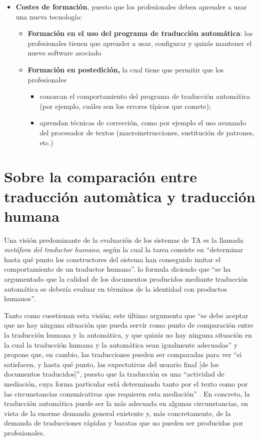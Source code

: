 \begin{itemize}
\item \textbf{Costes de formación}, puesto que los profesionales deben aprender a usar una nueva tecnología: \begin{itemize} \item \textbf{Formación en el uso del programa de traducción automática}: los profesionales tienen que aprender a usar, configurar y quizás mantener el nuevo software asociado \item \textbf{Formación en postedición,} la cual tiene que permitir que los profesionales \begin{itemize} \item conozcan el comportamiento del programa de traducción automática (por ejemplo, cuáles son los errores típicos que comete); \item aprendan técnicas de corrección, como por ejemplo el uso avanzado del procesador de textos (macroinstrucciones, sustitución de patrones, etc.) \end{itemize} \end{itemize} \end{itemize} 

\section[Traducción automática y traducción humana]{Sobre la comparación entre traducción automàtica y traducción humana} \label{ss:humaut} Una visión predominante de la evaluación de los sistemas de TA es la llamada \emph{metáfora del traductor humano}, según la cual \citep{krauwer93j} la tarea consiste en ``determinar hasta qué punto los constructores del sistema han conseguido imitar el comportamiento de un traductor humano''. \citet[p.~262]{sager93b} lo formula diciendo que ``se ha argumentado que la calidad de los documentos producidos mediante traducción automática se debería evaluar en términos de la identidad con productos humanos''. 

Tanto \citet{krauwer93j} como \citet{sager93b} cuestionan esta visión; este último argumenta que ``se debe aceptar que no hay ninguna situación que pueda servir como punto de comparación entre la traducción humana y la automática, y que quizás no hay ninguna situación en la cual la traducción humana y la automática sean igualmente adecuadas'' \citep[p.~261]{sager93b} y propone que, en cambio, las traducciones pueden ser comparadas para ver ``si satisfacen, y hasta qué punto, las expectativas del usuario final [de los documentos traducidos]'', puesto que la traducción es una ``actividad de mediación, cuya forma particular está determinada tanto por el texto como por las circunstancias comunicativas que requieren esta mediación'' \citep[p.~261]{sager93b}. En concreto, la traducción automática puede ser la más adecuada en algunas circunstancias, en vista de la enorme demanda general existente y, más concretamente, de la demanda de traducciones rápidas y baratas que no pueden ser producidas por profesionales. 

